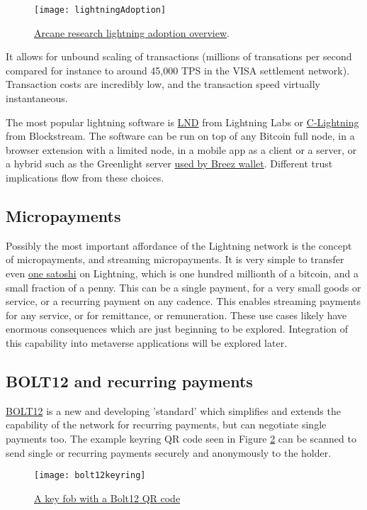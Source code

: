 \begin{figure}
  \centering
    \texttt{[image: lightningAdoption]}
  \caption{\href{https://www.research.arcane.no/the-state-of-lightning}{Arcane research lightning adoption overview}.}
  \label{fig:lightningAdoption}
\end{figure}
It allows for unbound scaling of transactions (millions of transations per second compared for instance to around 45,000 TPS in the VISA settlement network). Transaction costs are incredibly low, and the transaction speed virtually instantaneous.\par
The most popular lightning software is \href{https://github.com/lightningnetwork/lnd#readme}{LND} from Lightning Labs or \href{https://github.com/ElementsProject/lightning}{C-Lightning} from Blockstream. The software can be run on top of any Bitcoin full node, in a browser extension with a limited node, in a mobile app as a client or a server, or a hybrid such as the Greenlight server \href{https://medium.com/breez-technology/get-ready-for-a-fresh-breez-multiple-apps-one-node-optimal-ux-519c4daf2536}{used by Breez wallet}. Different trust implications flow from these choices.
\subsection{Micropayments}
Possibly the most important affordance of the Lightning network is the concept of micropayments, and streaming micropayments. It is very simple to transfer even \href{https://satsymbol.com/}{one satoshi} on Lightning, which is one hundred millionth of a bitcoin, and a small fraction of a penny. This can be a single payment, for a very small goods or service, or a recurring payment on any cadence. This enables streaming payments for any service, or for remittance, or remuneration. These use cases likely have enormous consequences which are just beginning to be explored. Integration of this capability into metaverse applications will be explored later.
\subsection{BOLT12 and recurring payments}
\href{https://bolt12.org/}{BOLT12} is a new and developing 'standard' which simplifies and extends the capability of the network for recurring payments, but can negotiate single payments too. The example keyring QR code seen in Figure \ref{fig:bolt12keyring} can be scanned to send single or recurring payments securely and anonymously to the holder.
\begin{figure}
  \centering
    \texttt{[image: bolt12keyring]}
  \caption{\href{https://twitter.com/SeedMint21/status/1518934554840600579}{A key fob with a Bolt12 QR code}}
  \label{fig:bolt12keyring}
\end{figure}
